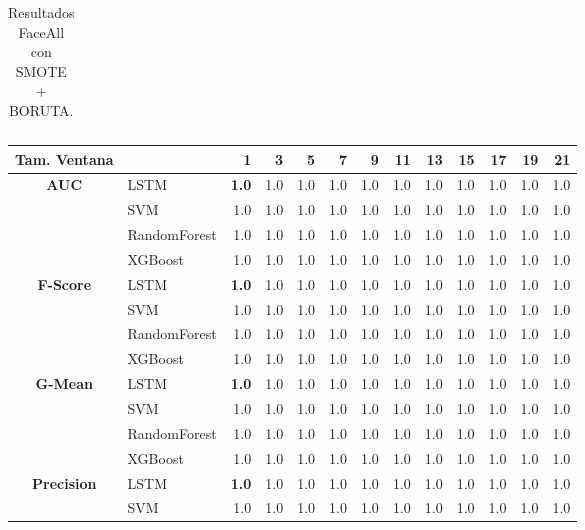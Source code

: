 \begin{table}[h]
\begin{adjustbox}{max width=11cm}
\begin{tabular}{|c|l|r|r|r|r|r|r|r|r|r|r|r|}
		\end{tabular}
	\end{adjustbox}
	\caption{Resultados FaceAll con SMOTE + BORUTA.}
	\label{tab:faceAllSMOTEBORUTA}
\end{table}

\begin{table}[h]
	\centering
	\begin{adjustbox}{max width=11cm}
		\begin{tabular}{|c|l|r|r|r|r|r|r|r|r|r|r|r|}
			\hline
			\textbf{Tam. Ventana}&         &   1  &   3  &   5  &   7  &   9  &   11 &   13 &   15 &   17 &   19 &   21 \\
			\hline
			\textbf{AUC} & LSTM &  \textbf{1.0} &  1.0 &  1.0 &  1.0 &  1.0 &  1.0 &  1.0 &  1.0 &  1.0 &  1.0 &  1.0 \\
			& SVM &  1.0 &  1.0 &  1.0 &  1.0 &  1.0 &  1.0 &  1.0 &  1.0 &  1.0 &  1.0 &  1.0 \\
			& RandomForest &  1.0 &  1.0 &  1.0 &  1.0 &  1.0 &  1.0 &  1.0 &  1.0 &  1.0 &  1.0 &  1.0 \\
			& XGBoost &  1.0 &  1.0 &  1.0 &  1.0 &  1.0 &  1.0 &  1.0 &  1.0 &  1.0 &  1.0 &  1.0 \\
			\hline
			\textbf{F-Score} & LSTM &  \textbf{1.0} &  1.0 &  1.0 &  1.0 &  1.0 &  1.0 &  1.0 &  1.0 &  1.0 &  1.0 &  1.0 \\
			& SVM &  1.0 &  1.0 &  1.0 &  1.0 &  1.0 &  1.0 &  1.0 &  1.0 &  1.0 &  1.0 &  1.0 \\
			& RandomForest &  1.0 &  1.0 &  1.0 &  1.0 &  1.0 &  1.0 &  1.0 &  1.0 &  1.0 &  1.0 &  1.0 \\
			& XGBoost &  1.0 &  1.0 &  1.0 &  1.0 &  1.0 &  1.0 &  1.0 &  1.0 &  1.0 &  1.0 &  1.0 \\
			\hline
			\textbf{G-Mean} & LSTM &  \textbf{1.0} &  1.0 &  1.0 &  1.0 &  1.0 &  1.0 &  1.0 &  1.0 &  1.0 &  1.0 &  1.0 \\
			& SVM &  1.0 &  1.0 &  1.0 &  1.0 &  1.0 &  1.0 &  1.0 &  1.0 &  1.0 &  1.0 &  1.0 \\
			& RandomForest &  1.0 &  1.0 &  1.0 &  1.0 &  1.0 &  1.0 &  1.0 &  1.0 &  1.0 &  1.0 &  1.0 \\
			& XGBoost &  1.0 &  1.0 &  1.0 &  1.0 &  1.0 &  1.0 &  1.0 &  1.0 &  1.0 &  1.0 &  1.0 \\
			\hline
			\textbf{Precision} & LSTM &  \textbf{1.0} &  1.0 &  1.0 &  1.0 &  1.0 &  1.0 &  1.0 &  1.0 &  1.0 &  1.0 &  1.0 \\
			& SVM &  1.0 &  1.0 &  1.0 &  1.0 &  1.0 &  1.0 &  1.0 &  1.0 &  1.0 &  1.0 &  1.0 \\

\end{tabular}
\end{adjustbox}
\end{table}
